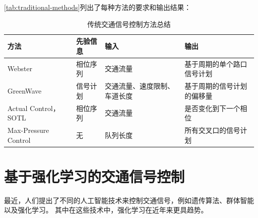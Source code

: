 \autoref{tab:traditional-methods}列出了每种方法的要求和输出结果：
\begin{table}[htb]
    \caption{传统交通信号控制方法总结\label{tab:traditional-methods}}
    \begin{tabular}{llll}
      \toprule
      方法 & 先验信息 & 输入 & 输出 \\
      \midrule
      Webster & 相位序列 & 交通流量 & 基于周期的单个路口信号计划 \\
      GreenWave & 信号计划 & 交通流量、速度限制、车道长度 & 基于周期的信号计划的偏移量 \\
      Actual Control， SOTL & 相位序列& 交通流量 & 是否变化到下一个相位\\
      Max-Pressure Control & 无 & 队列长度 & 所有交叉口的信号计划\\
      \bottomrule
    \end{tabular}
\end{table}

\section{基于强化学习的交通信号控制}
最近，人们提出了不同的人工智能技术来控制交通信号，例如遗传算法、群体智能以及强化学习。 其中在这些技术中，强化学习在近年来更具趋势。

